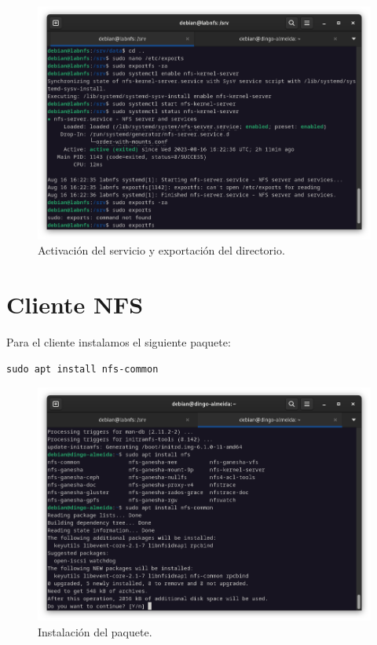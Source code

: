 \begin{figure}[H]
	\centering
	\includegraphics[scale=0.30]{02}
	\caption{Activación del servicio y exportación del directorio.}
\end{figure}

\newpage
\section{Cliente NFS}

Para el cliente instalamos el siguiente paquete:

\begin{lstlisting}[style=mybash]
sudo apt install nfs-common
\end{lstlisting}

\begin{figure}[H]
	\centering
	\includegraphics[scale=0.30]{03}
	\caption{Instalación del paquete.}
\end{figure}

